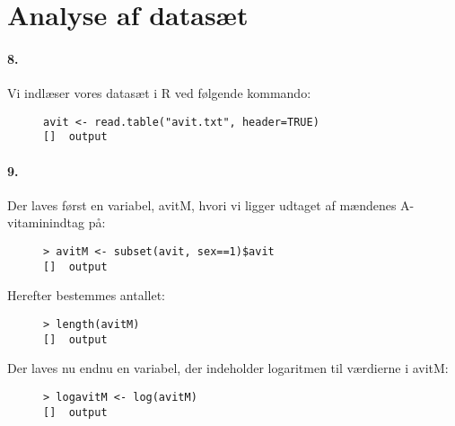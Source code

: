 \section{Analyse af datasæt}

\paragraph{8.}
Vi indlæser vores datasæt i R ved følgende kommando:

\begin{figure}[H]
\label{fig:anal0}
\begin{center}
\begin{verbatim}
avit <- read.table("avit.txt", header=TRUE)
[]  output
\end{verbatim}
\caption{}
\end{center}
\end{figure}

\paragraph{9.}
Der laves først en variabel, avitM, hvori vi ligger udtaget af 
mændenes A-vitaminindtag på:

\begin{figure}[H]
\label{fig:anal1}
\begin{center}
\begin{verbatim}
> avitM <- subset(avit, sex==1)$avit
[]  output
\end{verbatim}
\caption{}
\end{center}
\end{figure}

Herefter bestemmes antallet:

\begin{figure}[H]
\label{fig:anal2}
\begin{center}
\begin{verbatim}
> length(avitM)
[]  output
\end{verbatim}
\caption{}
\end{center}
\end{figure}

Der laves nu endnu en variabel, der indeholder logaritmen til 
værdierne i avitM:

\begin{figure}[H]
\label{fig:anal3}
\begin{center}
\begin{verbatim}
> logavitM <- log(avitM)
[]  output
\end{verbatim}
\caption{}
\end{center}
\end{figure}

